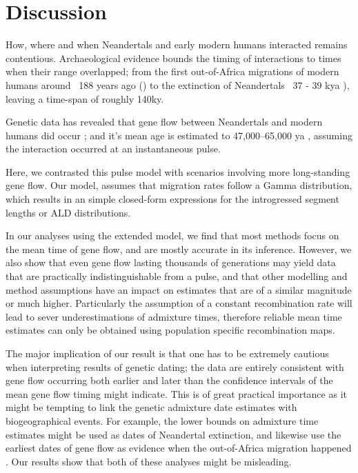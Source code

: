 \section{Discussion}\label{discussion}

How, where and when Neandertals and early modern humans interacted remains contentious.  
Archaeological evidence bounds the timing of interactions to times when their range overlapped; from the first out-of-Africa migrations of modern humans around ~188 years ago (\cite{stringer_when_2018,hershkovitz_earliest_2018}) to the extinction of Neandertals ~37 - 39 kya \cite{higham_timing_2014,zilhao_precise_2017}), leaving a time-span of roughly 140ky.

Genetic data has revealed that gene flow between Neandertals and modern humans did occur \cite{green_draft_2010}; and it's mean age is estimated to 47,000–65,000 ya \citep{sankararaman_date_2012}, assuming the interaction occurred at an instantaneous pulse.

Here, we contrasted this pulse model with scenarios involving more long-standing gene flow.  Our model, assumes that migration rates  follow a Gamma distribution, which results in an simple closed-form expressions for the introgressed segment lengths or ALD  distributions. 

In our analyses using the extended model, we find that most methods focus on the mean time of gene flow, and are mostly accurate in its inference. However, we also show that even gene flow lasting thousands of generations may yield data that are practically indistinguishable from a pulse, and that other modelling and method assumptions have an impact on estimates that are of a similar magnitude or much higher. Particularly the assumption of a constant recombination rate will lead to sever underestimations of admixture times, therefore reliable mean time estimates can only be obtained using population specific recombination maps.

The major implication of our result is that one has to be extremely cautious when interpreting results of genetic dating; the data are entirely consistent with gene flow occurring both earlier and later than the confidence intervals of the mean gene flow timing might indicate. This is of great practical importance as it might be tempting to link the genetic admixture date estimates with biogeographical events. For example, the lower bounds on admixture time estimates might be used as dates of Neandertal extinction, and likewise use the earliest dates of gene flow as evidence when the out-of-Africa migration happened \citep{sankararaman_date_2012}. Our results show that both of these analyses might be misleading.




